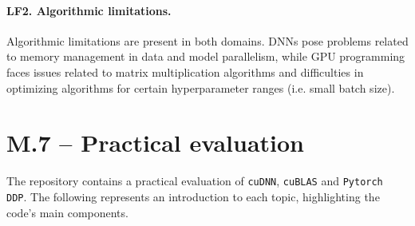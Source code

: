 \paragraph{LF2. Algorithmic limitations.}
Algorithmic limitations are present in both domains. DNNs pose problems related to memory
management in data and model parallelism, while GPU programming faces issues related to matrix
multiplication algorithms and difficulties in optimizing algorithms for certain hyperparameter
ranges (i.e. small batch size).




\section{M.7 -- Practical evaluation}
\label{sec:practical-evaluation}
The repository contains a practical evaluation of \texttt{cuDNN}, \texttt{cuBLAS} and \texttt{Pytorch DDP}.
The following represents an introduction to each topic, highlighting the code's main components.


